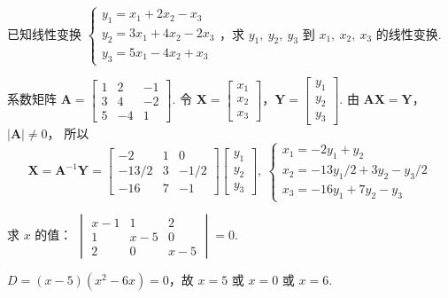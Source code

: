 \begin{problem}[本题3分]
  已知线性变换
  $\begin{cases}
    y_1 = x_1 +  2x_2 - x_3\\
    y_2 = 3x_1 + 4x_2 - 2x_3\\
    y_3 = 5x_1 - 4x_2 + x_3
  \end{cases}$，求 $y_1,~ y_2,~ y_3$ 到 $x_1,~ x_2,~ x_3$ 的线性变换.
\end{problem}
\scratch[10ex]
\begin{solution}
  系数矩阵 $\mathbf A =
  \begin{bmatrix}
    1 & 2 & -1\\
    3 & 4 & -2\\
    5 &-4 & 1
  \end{bmatrix}$. 令 $\mathbf X =
  \begin{bmatrix}
    x_1\\x_2\\x_3
  \end{bmatrix}$，$\mathbf Y = 
  \begin{bmatrix}
    y_1\\y_2\\y_3
  \end{bmatrix}$.
  由 $\mathbf{AX} = \mathbf Y$，$|\mathbf A| \neq 0$，
  所以
  \[
    \mathbf X = \mathbf A^{-1}\mathbf Y =
    \begin{bmatrix}
      -2    & 1 & 0   \\
      -13/2 & 3 & -1/2\\
      -16   & 7 & -1
    \end{bmatrix}
    \begin{bmatrix}
      y_1\\y_2\\y_3
    \end{bmatrix},~
    \begin{cases}
      x_1 = -2y_1    + y_2\\
      x_2 = -13y_1/2 + 3y_2 - y_3/2\\
      x_3 = -16y_1   + 7y_2 - y_3
    \end{cases}
  \]
\end{solution}

\begin{problem}[本题6分]
  求 $x$ 的值：
  $\begin{vmatrix}
    x - 1 & 1 & 2\\
    1     &x-5& 0\\
    2     & 0 & x-5
  \end{vmatrix} = 0$.
\end{problem}
\scratch[8ex]
\begin{solution}
  $D = (x - 5) (x^2 - 6x) = 0$，故 $x = 5$ 或 $x = 0$ 或 $x = 6$.
\end{solution}

